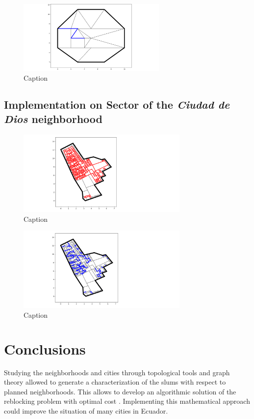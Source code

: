 \documentclass[10pt]{article}
\begin{document}
\begin{figure}[H]
    \centering
    \includegraphics[width=0.65\textwidth]{images/opt_est}
    \caption{Caption}
    \label{fig:my_label}
\end{figure}


\subsection{Implementation on Sector of the \emph{Ciudad de Dios} neighborhood}



\begin{figure}[H]
    \centering
    \includegraphics[width=0.75\textwidth]{images/parcels}
    \caption{Caption}
    \label{fig:my_label}
\end{figure}

\begin{figure}[H]
    \centering
    \includegraphics[width=0.75\textwidth]{images/parcels_2}
    \caption{Caption}
    \label{fig:my_label}
\end{figure}


\section{Conclusions}
Studying the neighborhoods and cities through topological tools and graph theory allowed to generate a characterization of the slums with respect to planned neighborhoods. This allows to develop an algorithmic solution of the reblocking problem with optimal cost \cite{bre}. Implementing this mathematical approach could improve the situation of many cities in Ecuador.


 
 

\end{document}

